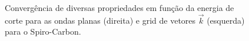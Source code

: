\documentclass[
	12pt,				%
	openright,			%
	twoside,			%
	a4paper,			%
	chapter=TITLE,		%
	english,			%
	french,				%
	spanish,			%
	brazil				%
	]{abntex2}
\begin{document}
\begin{apendicesenv}
		\begin{figure}[!h]
			\centering
			\caption{Convergência de diversas propriedades em função da energia de corte para as ondas planas (direita) e grid de vetores $\vec{k}$ (esquerda) para o Spiro-Carbon.}
			\label{conv_spiro}
		\end{figure}
	

\end{apendicesenv}
\end{document}
